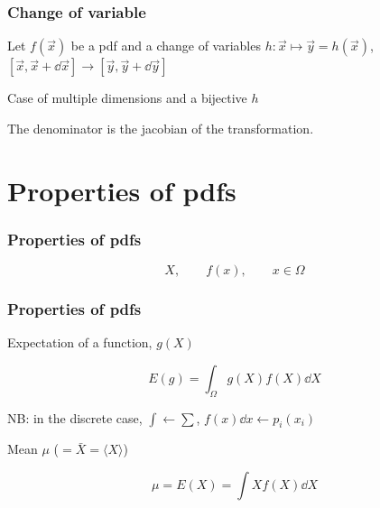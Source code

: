 \documentclass[9pt]{beamer}
\newif\ifmynote
\newcommand\mynote[1]{%
\ifmynote \textbf{#1} \else \fi
}
\begin{document}
\begin{frame}
 \frametitle{Change of variable}
 
 \mynote{Écrire au tableau}
 
 Let $f(\vec{x})$ be a pdf and a change of variables $h: \vec{x} \mapsto \vec{y} = h(\vec{x})$, $[\vec{x}, \vec{x} + \dd\vec{x}] \to [\vec{y}, \vec{y} + \dd\vec{y}]$
 
 \vspace{10pt}
 

 \begin{block}{Case of multiple dimensions and a bijective $h$}
  
  The denominator is the jacobian of the transformation.
 \end{block}


 
\end{frame}

\section{Properties of pdfs}

\begin{frame}
 \frametitle{Properties of pdfs}
 
 \mynote{Écrire au tableau}
 
 $$X,\qquad f(x),\qquad x \in \Omega$$
  
\end{frame}

\begin{frame}
 \frametitle{Properties of pdfs}
 
 \mynote{Écrire au tableau}
 
 \begin{block}{Expectation of a function, $g(X)$}
  
  $$E(g) = \int_\Omega g(X) f(X) \dd X$$
  
  {\footnotesize NB: in the discrete case, $\int \leftarrow \sum$, $f(x) \dd x \leftarrow p_i (x_i)$ }
 \end{block}
 
 \begin{block}{Mean $\mu$ ($= \bar{X} = \langle X \rangle$)}
 
  $$\mu = E(X) = \int X f(X) \dd X$$
 \end{block}
 
 \end{frame}
\end{document}
